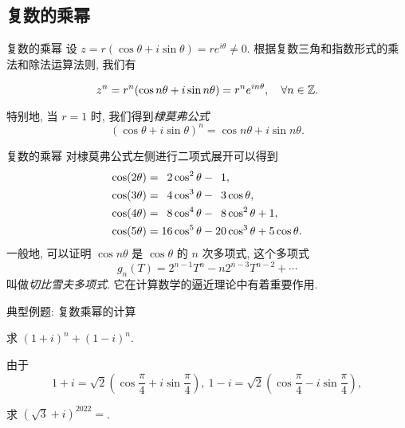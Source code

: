 \subsection{复数的乘幂}

\begin{frame}{复数的乘幂}
	\onslide<+->
	设 $z=r(\cos\theta+i\sin\theta)=re^{i\theta}\neq0$.
	\onslide<+->
	根据复数三角和指数形式的乘法和除法运算法则, 我们有
	\onslide<+->
	\begin{theorem}[复数的乘幂]
		\[z^n=r^n(\cos{n\theta}+i\sin{n\theta})=r^ne^{in\theta},\quad\forall n\in{\mathbb{Z}}.\]
	\end{theorem}
	\onslide<+->
	特别地, 当 $r=1$ 时, 我们得到\emph{棣莫弗公式}
	\[(\cos\theta+i\sin\theta)^n=\cos{n\theta}+i\sin{n\theta}.\]
\end{frame}


\begin{frame}{复数的乘幂\noexer}
	\onslide<+->
	对棣莫弗公式左侧进行二项式展开可以得到
	\onslide<+->
	\begin{align*}
		\cos(2\theta)&=\hphantom{1}2\cos^2\theta-\hphantom{1}1,\\
		\cos(3\theta)&=\hphantom{1}4\cos^3\theta-\hphantom{1}3\cos\theta,\\
		\cos(4\theta)&=\hphantom{1}8\cos^4\theta-\hphantom{1}8\cos^2\theta+1,\\
		\cos(5\theta)&=16\cos^5\theta-20\cos^3\theta+5\cos\theta.
	\end{align*}
	\onslide<+->
	一般地, 可以证明 $\cos{n\theta}$ 是 $\cos\theta$ 的 $n$ 次多项式,
	\onslide<+->
	这个多项式
	\[g_n(T)=2^{n-1}T^n-n2^{n-3}T^{n-2}+\cdots\]
	叫做\emph{切比雪夫多项式}.
	\onslide<+->
	它在计算数学的逼近理论中有着重要作用.
\end{frame}


\begin{frame}{典型例题: 复数乘幂的计算}
	\onslide<+->
	\begin{example}
		求 $(1+i)^n+(1-i)^n$.
	\end{example}

	\onslide<+->
	\begin{solution}
		由于
		\[1+i=\sqrt2\left(\cos\frac\pi4+i\sin\frac\pi4\right),\ 
		1-i=\sqrt2\left(\cos\frac\pi4-i\sin\frac\pi4\right),\]
		\onslide<+->{%
			因此
			\[
				(1+i)^n+(1-i)^n
				=2^{\frac n2}\left(\cos\frac{n\pi}4+i\sin\frac{n\pi}4+\cos\frac{n\pi}4-i\sin\frac{n\pi}4\right)
				\visible<+->{=2^{\frac n2+1}\cos\frac{n\pi}4.}
			\]
		}\vspace{-\baselineskip}
	\end{solution}

	\onslide<+->
	\begin{exercise}
		求 $(\sqrt3+i)^{2022}=$.
	\end{exercise}
\end{frame}


